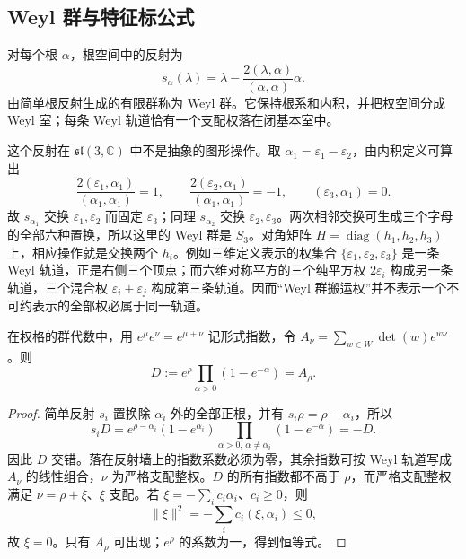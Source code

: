 \subsection{Weyl 群与特征标公式}

对每个根 $\alpha$，根空间中的反射为
\[
s_\alpha(\lambda)=\lambda-
\frac{2(\lambda,\alpha)}{(\alpha,\alpha)}\alpha.
\]
由简单根反射生成的有限群称为 Weyl 群。它保持根系和内积，并把权空间分成 Weyl 室；每条 Weyl 轨道恰有一个支配权落在闭基本室中。

这个反射在 $\mathfrak{sl}(3,\mathbb C)$ 中不是抽象的图形操作。取 $\alpha_1=\varepsilon_1-\varepsilon_2$，由内积定义可算出
\[
\frac{2(\varepsilon_1,\alpha_1)}{(\alpha_1,\alpha_1)}=1,
\qquad
\frac{2(\varepsilon_2,\alpha_1)}{(\alpha_1,\alpha_1)}=-1,
\qquad
(\varepsilon_3,\alpha_1)=0.
\]
故 $s_{\alpha_1}$ 交换 $\varepsilon_1,\varepsilon_2$ 而固定 $\varepsilon_3$；同理 $s_{\alpha_2}$ 交换 $\varepsilon_2,\varepsilon_3$。两次相邻交换可生成三个字母的全部六种置换，所以这里的 Weyl 群是 $S_3$。对角矩阵 $H=\operatorname{diag}(h_1,h_2,h_3)$ 上，相应操作就是交换两个 $h_i$。例如三维定义表示的权集合 $\{\varepsilon_1,\varepsilon_2,\varepsilon_3\}$ 是一条 Weyl 轨道，正是右侧三个顶点；而六维对称平方的三个纯平方权 $2\varepsilon_i$ 构成另一条轨道，三个混合权 $\varepsilon_i+\varepsilon_j$ 构成第三条轨道。因而“Weyl 群搬运权”并不表示一个不可约表示的全部权必属于同一轨道。

\begin{lemma}
在权格的群代数中，用 $e^\mu e^\nu=e^{\mu+\nu}$ 记形式指数，令 $A_\nu=\sum_{w\in W}\det(w)e^{w\nu}$。则
\[
 D:=e^\rho\prod_{\alpha>0}(1-e^{-\alpha})=A_\rho.
\]
\end{lemma}
\begin{proof}
简单反射 $s_i$ 置换除 $\alpha_i$ 外的全部正根，并有 $s_i\rho=\rho-\alpha_i$，所以
\[
 s_iD=e^{\rho-\alpha_i}(1-e^{\alpha_i})
 \prod_{\alpha>0,\,\alpha\ne\alpha_i}(1-e^{-\alpha})=-D.
\]
因此 $D$ 交错。落在反射墙上的指数系数必须为零，其余指数可按 Weyl 轨道写成 $A_\nu$ 的线性组合，$\nu$ 为严格支配整权。$D$ 的所有指数都不高于 $\rho$，而严格支配整权满足 $\nu=\rho+\xi$、$\xi$ 支配。若 $\xi=-\sum_i c_i\alpha_i$、$c_i\ge0$，则
\[
 \|\xi\|^2=-\sum_i c_i(\xi,\alpha_i)\le0,
\]
故 $\xi=0$。只有 $A_\rho$ 可出现；$e^\rho$ 的系数为一，得到恒等式。
\end{proof}

